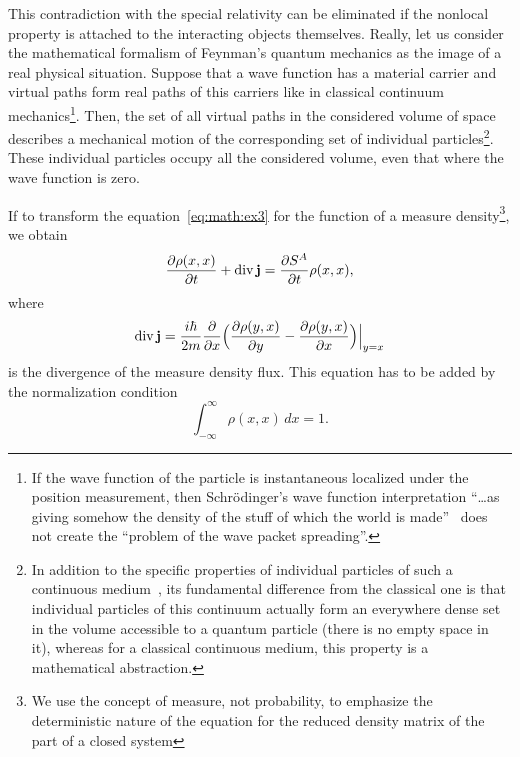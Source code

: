 This contradiction with the special relativity can be eliminated if the nonlocal property is attached to the interacting objects themselves. Really, let us consider the mathematical formalism of Feynman's quantum mechanics as the image of a real physical situation. Suppose that a wave function has a material carrier and virtual paths form real paths of this carriers like in classical continuum {mechanics\footnote{If the wave function of the particle is instantaneous localized under the position measurement, then Schr\"odinger's wave function interpretation ``\dots as giving somehow the density of the stuff of which the world is made''~\cite{bib:3} does not create the ``problem of the wave packet spreading''.}\!\!.} \linebreak Then, the set of all virtual paths in the considered volume of space describes a mechanical motion of the corresponding set of individual particles\footnote{In addition to the specific properties of individual particles of such a continuous medium~\cite{bib:20}, its fundamental difference from the classical one is that individual particles of this continuum actually form an everywhere dense set in the volume accessible to a quantum particle (there is no empty space in it), whereas for a classical continuous medium, this property is a mathematical abstraction.}\!\!. These individual particles occupy all the considered volume, even that where the wave function is zero.

If to transform the equation~\eqref{eq:math:ex3} for the function of a measure density\footnote{We use the concept of measure, not probability, to emphasize the deterministic nature of the equation for the reduced density matrix of the part of a closed system}\!\!, we obtain  
 \begin{equation*}
 \frac{\partial\rho(x,x)}{\partial t}+\mathop{\rm div}{\bf j}=\frac{\partial S^A}{\partial t}\rho(x,x),
\end{equation*}
where 
\begin{equation*}
\mathop{\rm div} {\bf j}=\frac{i\hbar}{2m}\frac{\partial}{\partial x}\Bigl(\frac{\partial\rho(y,x)}{\partial y}-\frac{\partial\rho(y,x)}{\partial x}\Bigr)\Big|_{y=x}
\end{equation*}
is the divergence of the measure density flux. This equation has to be added by the normalization condition  
\begin{equation*}
 \int _{-\infty}^{\infty}\rho(x,x)\,dx=1.
 \end{equation*}
 
